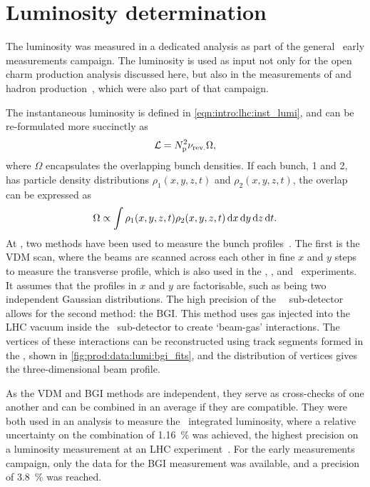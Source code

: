 \section{Luminosity determination}
\label{chap:prod:data:lumi}

The luminosity was measured in a dedicated analysis as part of the general 
\lhcb\ early measurements campaign.
The luminosity is used as input not only for the open charm production analysis 
discussed here, but also in the measurements of \PJpsi and \PB hadron 
production~\cite{LHCb-PAPER-2015-037,LHCb-PAPER-2016-031}, which were also part 
of that campaign.

The instantaneous luminosity is defined in \cref{eqn:intro:lhc:inst_lumi}, and 
can be re-formulated more succinctly as
\begin{equation}
  \mathcal{L} = N_{\text{p}}^{2}\nu_{\textnormal{rev.}}\Omega,
  \label{eqn:prod:data:lumi}
\end{equation}
where $\Omega$ encapsulates the overlapping bunch densities.
If each bunch, 1 and 2, has particle density distributions $\rho_{1}(x, y, z, 
t)$ and $\rho_{2}(x, y, z, t)$, the overlap can be expressed as
\begin{equation}
  \Omega \propto \int \rho_{1}(x, y, z, t)\rho_{2}(x, y, z, t)
                      \mathop{}\!\textnormal{d}{x}\mathop{}\!\textnormal{d}{y}\mathop{}\!\textnormal{d}{z}\mathop{}\!\textnormal{d}{t}.
  \label{eqn:prod:data:lumi:profile}
\end{equation}
At \lhcb, two methods have been used to measure the bunch 
profiles~\cite{LHCb-PAPER-2014-047}.
The first is the \ac{VDM} scan, where the beams are scanned across each other 
in fine $x$ and $y$ steps to measure the transverse profile, which is also used 
in the \atlas, \cms, and \alice\ experiments.
It assumes that the profiles in $x$ and $y$ are factorisable, such as being two 
independent Gaussian distributions.
The high precision of the \lhcb\ \velo\ sub-detector allows for the second 
method: the \ac{BGI}.
This method uses gas injected into the \ac{LHC} vacuum inside the \velo\ 
sub-detector to create `beam-gas' interactions.
The vertices of these interactions can be reconstructed using track segments 
formed in the \velo, shown in \cref{fig:prod:data:lumi:bgi_fits}, and the 
distribution of vertices gives the three-dimensional beam profile.

As the \ac{VDM} and \ac{BGI} methods are independent, they serve as 
cross-checks of one another and can be combined in an average if they are 
compatible.
They were both used in an analysis to measure the \runone\ integrated 
luminosity, where a relative uncertainty on the combination of 
\SI{1.16}{\percent} was achieved, the highest precision on a luminosity 
measurement at an \ac{LHC} experiment~\cite{LHCb-PAPER-2014-047}.
For the early measurements campaign, only the data for the \ac{BGI} measurement 
was available, and a precision of \SI{3.8}{\percent} was reached.


